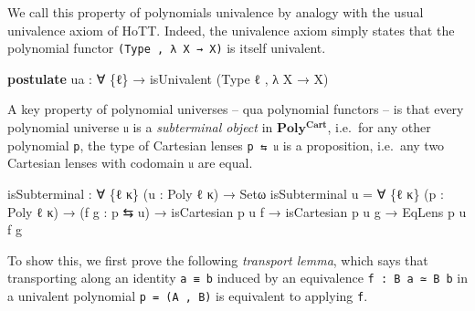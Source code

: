\documentclass[
  11pt,
  oneside,
  article]{memoir}
\newenvironment{Shaded}{}{}
\newcommand{\KeywordTok}[1]{\textcolor[rgb]{0.00,0.44,0.13}{\textbf{#1}}}
\newcommand{\NormalTok}[1]{#1}
\newcommand{\OtherTok}[1]{\textcolor[rgb]{0.00,0.44,0.13}{#1}}
\theoremstyle{definition}
\theoremstyle{plain}
\newcommand{\0}{\textsf{0}}
\newcommand{\1}{\tn{\textsf{1}}}
\begin{document}
We call this property of polynomials univalence by analogy with the
usual univalence axiom of HoTT. Indeed, the univalence axiom simply
states that the polynomial functor \texttt{(Type\ ,\ λ\ X\ →\ X)} is
itself univalent.

\begin{Shaded}
\begin{Highlighting}[]
\KeywordTok{postulate}
\NormalTok{    ua }\OtherTok{:} \OtherTok{∀} \OtherTok{\{}\NormalTok{ℓ}\OtherTok{\}} \OtherTok{→}\NormalTok{ isUnivalent }\OtherTok{(}\NormalTok{Type ℓ , }\OtherTok{λ}\NormalTok{ X }\OtherTok{→}\NormalTok{ X}\OtherTok{)}
\end{Highlighting}
\end{Shaded}

A key property of polynomial universes -- qua polynomial functors -- is
that every polynomial universe \texttt{𝔲} is a \emph{subterminal object}
in \(\mathbf{Poly^{Cart}}\), i.e.~for any other polynomial \texttt{p},
the type of Cartesian lenses \texttt{p\ ⇆\ 𝔲} is a proposition, i.e.~any
two Cartesian lenses with codomain \texttt{𝔲} are equal.

\begin{Shaded}
\begin{Highlighting}[]
\NormalTok{isSubterminal }\OtherTok{:} \OtherTok{∀} \OtherTok{\{}\NormalTok{ℓ κ}\OtherTok{\}} \OtherTok{(}\NormalTok{u }\OtherTok{:}\NormalTok{ Poly ℓ κ}\OtherTok{)} \OtherTok{→}\NormalTok{ Setω}
\NormalTok{isSubterminal u }\OtherTok{=} \OtherTok{∀} \OtherTok{\{}\NormalTok{ℓ\textquotesingle{} κ\textquotesingle{}}\OtherTok{\}} \OtherTok{(}\NormalTok{p }\OtherTok{:}\NormalTok{ Poly ℓ\textquotesingle{} κ\textquotesingle{}}\OtherTok{)}
                  \OtherTok{→} \OtherTok{(}\NormalTok{f g }\OtherTok{:}\NormalTok{ p ⇆ u}\OtherTok{)}
                  \OtherTok{→}\NormalTok{ isCartesian p u f}
                  \OtherTok{→}\NormalTok{ isCartesian p u g}
                  \OtherTok{→}\NormalTok{ EqLens p u f g}
\end{Highlighting}
\end{Shaded}

To show this, we first prove the following \emph{transport lemma}, which
says that transporting along an identity \texttt{a\ ≡\ b} induced by an
equivalence \texttt{f\ :\ B\ a\ ≃\ B\ b} in a univalent polynomial
\texttt{p\ =\ (A\ ,\ B)} is equivalent to applying \texttt{f}.
\end{document}
